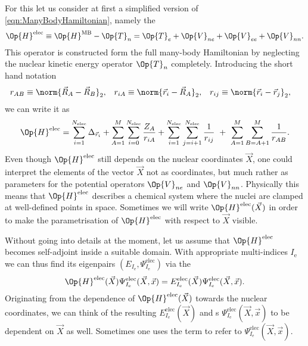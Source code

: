 For this let us consider at first
a simplified version of \eqref{eqn:ManyBodyHamiltonian},
namely the 
\[
	\Op{H}^\text{elec} \equiv \Op{H}^\text{MB} - \Op{T}_n
	= \Op{T}_e + \Op{V}_{ne} + \Op{V}_{ee} + \Op{V}_{nn}.
\]
This operator is constructed form the full many-body Hamiltonian
by neglecting the nuclear kinetic energy operator $\Op{T}_n$ completely.
Introducing the short hand notation
\begin{align*}
r_{AB} &\equiv \norm{\vec{R}_A - \vec{R}_B}_2, &
r_{iA} &\equiv \norm{\vec{r}_i - \vec{R}_A}_2, &
r_{ij} &\equiv \norm{\vec{r}_i - \vec{r}_j}_2, &
\end{align*}
we can write it as
\begin{equation}
	\Op{H}^\text{elec}
	= \sum_{i=1}^{\Nelec} \Delta_{\vec{r}_i}
	+ \sum_{A=1}^M \sum_{i=0}^{\Nelec} \frac{Z_A}{r_{iA}}
	+ \sum_{i=1}^{\Nelec} \sum_{j=i+1}^{\Nelec} \frac{1}{r_{ij}}
	\  + \  %
	\sum_{A=1}^{M} \sum_{B=A+1}^{M} \frac{1}{r_{AB}}.
	\label{eqn:ElectronicFullHamiltonian}
\end{equation}
Even though $\Op{H}^\text{elec}$ still depends on the nuclear coordinates $\vec{X}$,
one could interpret the elements of the vector
$\vec{X}$ not as coordinates,
but much rather as parameters for the potential operators $\Op{V}_{ne}$ and $\Op{V}_{nn}$.
Physically this means that $\Op{H}^\text{elec}$ describes a chemical system
where the nuclei are clamped at well-defined points in space.
Sometimes we will write $\Op{H}^\text{elec}(\vec{X})$
in order to make the parametrisation of $\Op{H}^\text{elec}$ with respect to $\vec{X}$
visible.

\newcommand{\Iel}{I_\text{e}}
\newcommand{\Inu}{I_\text{n}}
Without going into details at the moment,
let us assume that $\Op{H}^\text{elec}$ becomes self-adjoint
inside a suitable domain.
With appropriate multi-indices $\Iel$
we can thus find its eigenpairs $(E_{\Iel}, \Psi^\text{elec}_{\Iel})$
via the 
\begin{equation}
	\Op{H}^\text{elec}(\vec{X}) \Psi^\text{elec}_{\Iel}(\vec{X}, \vec{x})
	= E^\text{elec}_{\Iel}(\vec{X})
		\Psi^\text{elec}_{\Iel}(\vec{X}, \vec{x}).
	\label{eqn:ElectronicSchrödinger}
\end{equation}
Originating from the dependence of $\Op{H}^\text{elec}(\vec{X})$
towards the nuclear coordinates,
we can think of the resulting 
$E^\text{elec}_{\Iel}(\vec{X})$
and s $\Psi^\text{elec}_{\Iel}(\vec{X}, \vec{x})$
to be dependent on $\vec{X}$ as well.
Sometimes one uses the term 
to refer to $\Psi^\text{elec}_{\Iel}(\vec{X}, \vec{x})$.

